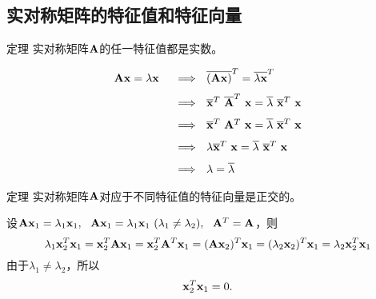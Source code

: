 \subsection{实对称矩阵的特征值和特征向量}

\begin{frame}
  \begin{footnotesize}
    \begin{block}{定理}
      实对称矩阵$\mathbf{A}$的任一特征值都是实数。
    \end{block}
    \pause\proofname
    $$
    \begin{array}{rl}
      \mathbf{A}\mathbf{x} = \lambda \mathbf{x}
      &~~\Longrightarrow~~
      \overline{(\mathbf{A}\mathbf{x})}^T = \overline{\lambda \mathbf{x}}^T\\[0.1in]
      &~~\Longrightarrow~~
      \overline{\mathbf{x}}^T~\overline{\mathbf{A}}^T~\mathbf{x} = \overline{\lambda} ~\overline{\mathbf{x}}^T~\mathbf{x}\\[0.1in]
      &~~\Longrightarrow~~
      \overline{\mathbf{x}}^T~\mathbf{A}^T~\mathbf{x} = \overline{\lambda} ~\overline{\mathbf{x}}^T~\mathbf{x}\\[0.1in]
      &~~\Longrightarrow~~
      \lambda \overline{\mathbf{x}}^T~\mathbf{x} = \overline{\lambda} ~\overline{\mathbf{x}}^T~\mathbf{x}\\[0.1in]
      &~~\Longrightarrow~~
      \lambda = \overline \lambda
    \end{array}
    $$
  \end{footnotesize}
\end{frame}


\begin{frame}
  \begin{footnotesize}
    \begin{block}{定理}
      实对称矩阵$\mathbf{A}$对应于不同特征值的特征向量是正交的。
    \end{block}
    \pause\proofname
    设$\mathbf{A}\mathbf{x}_1=\lambda_1\mathbf{x}_1,~~\mathbf{A}\mathbf{x}_1=\lambda_1\mathbf{x}_1~ (\lambda_1\ne\lambda_2), ~~\mathbf{A}^T=\mathbf{A}$，则
    $$
    \lambda_1\mathbf{x}_2^T\mathbf{x}_1=\mathbf{x}_2^T\mathbf{A}\mathbf{x}_1=\mathbf{x}_2^T\mathbf{A}^T\mathbf{x}_1=(\mathbf{A}\mathbf{x}_2)^T\mathbf{x}_1=(\lambda_2\mathbf{x}_2)^T\mathbf{x}_1=\lambda_2\mathbf{x}_2^T\mathbf{x}_1
    $$\pause
    由于$\lambda_1\ne\lambda_2$，所以
    $$
    \mathbf{x}_2^T\mathbf{x}_1=0.
    $$
  \end{footnotesize}
\end{frame}
